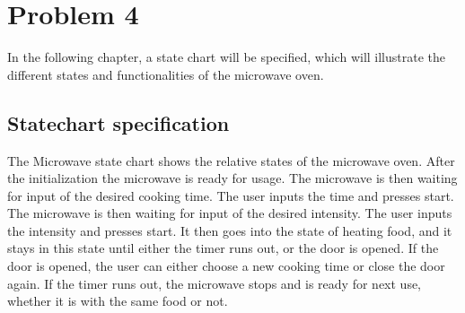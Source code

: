 \chapter{Problem 4}

In the following chapter, a state chart will be specified, which will illustrate the different states and functionalities of the microwave oven.

\section{Statechart specification}


The Microwave state chart shows the relative states of the microwave oven. After the initialization the microwave is ready for usage.
The microwave is then waiting for input of the desired cooking time. The user inputs the time and presses start. The microwave is then waiting for input of the desired intensity. The user inputs the intensity and presses start. 
It then goes into the state of heating food, and it stays in this state until either the timer runs out, or the door is opened. If the door is opened, the user can either choose a new cooking time or close the door again. If the timer runs out, the microwave stops and is ready for next use, whether it is with the same food or not. 
